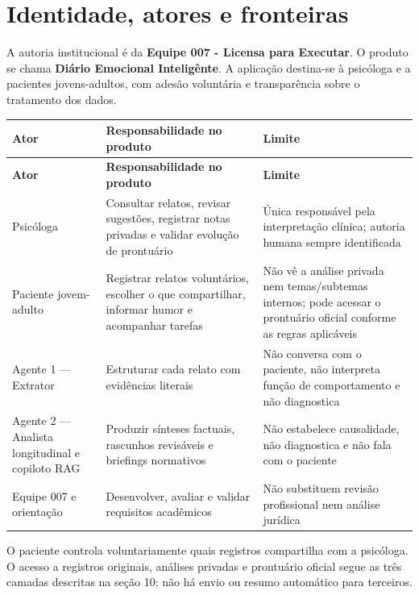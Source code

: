 \documentclass[11pt,a4paper]{article}
\begin{document}
\section{Identidade, atores e fronteiras}
A autoria institucional é da \textbf{Equipe 007 - Licensa para Executar}. O produto se chama \textbf{Diário Emocional Inteligênte}. A aplicação destina-se à psicóloga e a pacientes jovens-adultos, com adesão voluntária e transparência sobre o tratamento dos dados.

\begingroup\small
\begin{longtable}{>{\raggedright\arraybackslash}p{}>{\raggedright\arraybackslash}p{}>{\raggedright\arraybackslash}p{}}
\toprule
\textbf{Ator} & \textbf{Responsabilidade no produto} & \textbf{Limite} \\ \midrule\endfirsthead
\toprule
\textbf{Ator} & \textbf{Responsabilidade no produto} & \textbf{Limite} \\ \midrule\endhead
\bottomrule\endfoot
Psicóloga & Consultar relatos, revisar sugestões, registrar notas privadas e validar evolução de prontuário & Única responsável pela interpretação clínica; autoria humana sempre identificada \\[3pt]
Paciente jovem-adulto & Registrar relatos voluntários, escolher o que compartilhar, informar humor e acompanhar tarefas & Não vê a análise privada nem temas/subtemas internos; pode acessar o prontuário oficial conforme as regras aplicáveis \\[3pt]
Agente 1 — Extrator & Estruturar cada relato com evidências literais & Não conversa com o paciente, não interpreta função de comportamento e não diagnostica \\[3pt]
Agente 2 — Analista longitudinal e copiloto RAG & Produzir sínteses factuais, rascunhos revisáveis e briefings normativos & Não estabelece causalidade, não diagnostica e não fala com o paciente \\[3pt]
Equipe 007 e orientação & Desenvolver, avaliar e validar requisitos acadêmicos & Não substituem revisão profissional nem análise jurídica \\[3pt]
\end{longtable}
\endgroup
O paciente controla voluntariamente quais registros compartilha com a psicóloga. O acesso a registros originais, análises privadas e prontuário oficial segue as três camadas descritas na seção 10; não há envio ou resumo automático para terceiros.
\end{document}
